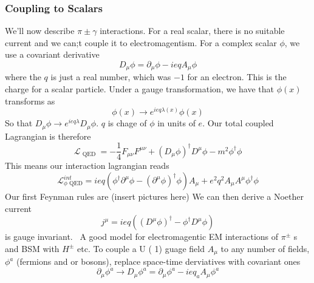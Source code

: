 \subsubsection{Coupling to Scalars} 
We'll now describe $ \pi \pm \gamma $ interactions.
For a real scalar, there is no suitable current and we can;t couple it to electromagentism. 
For a complex scalar $ \phi $, we use a covariant derivative 
\[
D _ \mu \phi = \partial  _ \mu \phi  - i e q A _ \mu \phi  
\] where the $ q $ is just a real number, which was $ - 1$ for an electron. 
This is the charge for a scalar particle. 
Under a gauge transformation, we have that $ \phi ( x) $ 
transforms as 
\[
	\phi ( x) \to e ^{ i e q \lambda ( x) } \phi ( x) 
\] So that $ D_ \mu \phi \to e ^{ i e q \lambda }  D_ \mu \phi $.
$ q $ is chage of $ \phi $ in units of $ e $. 
Our total coupled Lagrangian is 
therefore 
\[
	\mathcal{ L } _{ \text{ QED } }  = -\frac{1}{4 } F_{ \mu \nu }F ^{ \mu \nu }  +  \left( D _ \mu \phi \right)  ^{ \dagger } D ^ \mu \phi - m ^ 2 \phi ^ \dagger \phi  
\]
This means our interaction lagrangian reads 
\[
\mathcal{ L } _{ \phi \text{ QED} } ^{ int } = i e q
\left( \phi ^ \dagger \partial ^ \mu \phi  - \left( \partial  ^ \mu \phi  \right)  ^ \dagger 
\phi \right) A_ \mu + e ^ 2 q ^ 2 A _ \mu A ^ \mu \phi ^ \dagger \phi   
\]  Our first Feynman rules 
are (insert pictures here)
We can then derive a Noether current 
\[
	j ^ \mu  = i  eq \left( \left(  D^ \mu \phi  \right)  ^ \dagger  - \phi ^ \dagger D ^ \mu \phi  \right)  
\] is gauge invariant. 
A good model for electromagentic EM interactions of $ \pi ^{ \pm } $  
s and BSM with $ H ^{ \pm } $ etc. 
To couple a U ( 1) guage field $A _ \mu $ to any number of fields, 
$ \phi ^ a $ (fermions and or bosons), replace space-time derviatives with 
covariant ones 
\[
 \partial  _ \mu \phi ^ a \to D _ \mu \phi ^ a  = 
 \partial  _ \mu \phi ^ a  - ieq _ a A _ \mu \phi ^ a 
\]

